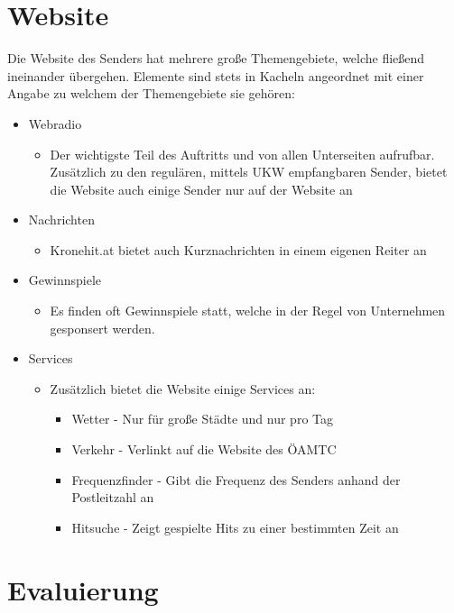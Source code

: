 \documentclass{article}
\begin{document}
	\section{Website}
	Die Website des Senders hat mehrere große Themengebiete, welche fließend ineinander übergehen. Elemente sind stets in Kacheln angeordnet mit einer Angabe zu welchem der Themengebiete sie gehören:
	\begin{itemize}
		\item{Webradio}
		\begin{itemize}
			\item{Der wichtigste Teil des Auftritts und von allen Unterseiten aufrufbar. Zusätzlich zu den regulären, mittels UKW empfangbaren Sender, bietet die Website auch einige Sender nur auf der Website an}
		\end{itemize}
		\item{Nachrichten}
		\begin{itemize}
			\item{Kronehit.at bietet auch Kurznachrichten in einem eigenen Reiter an}
		\end{itemize}
		\item{Gewinnspiele}
		\begin{itemize}
			\item{Es finden oft Gewinnspiele statt, welche in der Regel von Unternehmen gesponsert werden.}
		\end{itemize}
		\item{Services}
		\begin{itemize}
			\item{Zusätzlich bietet die Website einige Services an:}
			\begin{itemize}
				\item{Wetter - Nur für große Städte und nur pro Tag}
				\item{Verkehr - Verlinkt auf die Website des ÖAMTC}
				\item{Frequenzfinder - Gibt die Frequenz des Senders anhand der Postleitzahl an}
				\item{Hitsuche - Zeigt gespielte Hits zu einer bestimmten Zeit an}
			\end{itemize}
		\end{itemize}
	\end{itemize}
	\section{Evaluierung}
\end{document}
